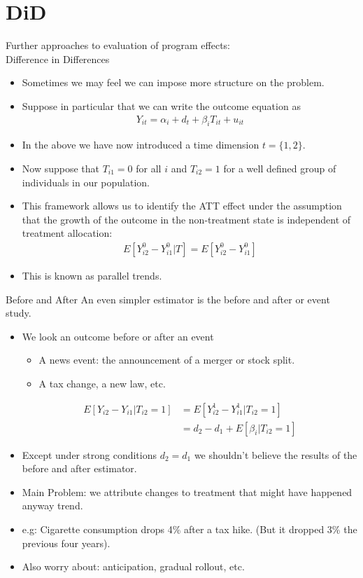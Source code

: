 \section{DiD}
\begin{frame}{Further approaches to evaluation of program effects: \\
{\small Difference in Differences } }
\begin{itemize}
\item Sometimes we may feel we can impose more structure on the problem.
\item Suppose in particular that we can write the outcome equation as
\begin{align*}
 Y_{it} =\alpha_i +d_t +\beta_i T_{it} +u_{it}
 \end{align*}
\item In the above we have now introduced a time dimension $t=\{1,2\}$. 
\item Now suppose that $T_{i1}=0$ for all $i$ and $T_{i2}=1$ for a well defined group of individuals in our population.
\item This framework allows us to identify the ATT effect under the assumption that the growth of the outcome in the non-treatment state is independent of treatment allocation:
\begin{align*}
E[Y_{i2}^0 - Y_{i1}^0 | T] = E[Y_{i2}^0 - Y_{i1}^0] 
\end{align*}
\item This is known as \alert{parallel trends}.
\end{itemize}
\end{frame}

\begin{frame}{Before and After} 
An even simpler estimator is the \alert{before and after} or \alert{event study}.
\begin{itemize}
\item We look an outcome before or after an event
\begin{itemize}
\item A news event: the announcement of a merger or stock split.
\item A tax change, a new law, etc.
\end{itemize}
\begin{align*}
E[Y_{i2} - Y_{i1} | T_{i2}=1] & = E[Y_{i2}^1 - Y_{i1}^1 | T_{i2}=1] \\
 &= d_2-d_1 + E[\beta_{i}| T_{i2}=1] 
\end{align*}
\item Except under strong conditions $d_2 = d_1$ we shouldn't believe the results of the before and after estimator.
\item Main Problem: we attribute changes to treatment that might have happened anyway \alert{trend}.
\item e.g: Cigarette consumption drops 4\% after a tax hike. (But it dropped 3\% the previous four years).
\item Also worry about: \alert{anticipation}, \alert{gradual rollout}, etc.
\end{itemize}
\end{frame}

